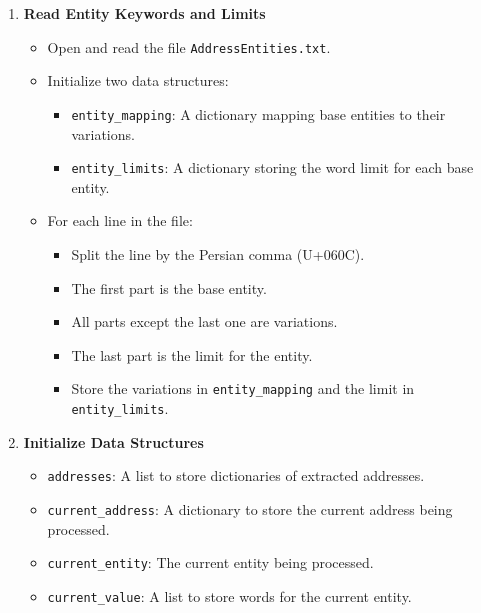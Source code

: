 \documentclass{solutionclass} %
\begin{document}
\begin{solution}
\begin{enumerate}
    \item \textbf{Read Entity Keywords and Limits}
    \begin{itemize}
        \item Open and read the file \texttt{AddressEntities.txt}.
        \item Initialize two data structures:
        \begin{itemize}
            \item \texttt{entity\_mapping}: A dictionary mapping base entities to their variations.
            \item \texttt{entity\_limits}: A dictionary storing the word limit for each base entity.
        \end{itemize}
        \item For each line in the file:
        \begin{itemize}
            \item Split the line by the Persian comma (U+060C).
            \item The first part is the base entity.
            \item All parts except the last one are variations.
            \item The last part is the limit for the entity.
            \item Store the variations in \texttt{entity\_mapping} and the limit in \texttt{entity\_limits}.
        \end{itemize}
    \end{itemize}

    \item \textbf{Initialize Data Structures}
    \begin{itemize}
        \item \texttt{addresses}: A list to store dictionaries of extracted addresses.
        \item \texttt{current\_address}: A dictionary to store the current address being processed.
        \item \texttt{current\_entity}: The current entity being processed.
        \item \texttt{current\_value}: A list to store words for the current entity.
    \end{itemize}


\end{enumerate}
\end{solution}
\end{document}
